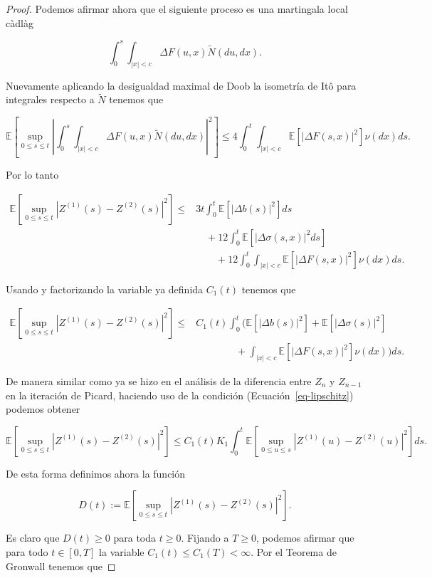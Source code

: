 \documentclass[
  spanish,
  us-letterpaper,
]{scrreprt}
\theoremstyle{plain}
\theoremstyle{plain}
\theoremstyle{definition}
\theoremstyle{plain}
\theoremstyle{remark}
\begin{document}
\begin{proof}
Podemos afirmar ahora que el siguiente proceso es una martingala local
càdlàg

\[
    \int_0^s\int_{|x|<c} \Delta F(u,x)\widetilde{N}(du,dx).
\]

Nuevamente aplicando la desigualdad maximal de Doob la isometría de Itô
para integrales respecto a \(\widetilde{N}\) tenemos que

\[
    \mathbb{E}\left[\sup\limits_{0\leq s\leq t}\left|\int_0^s\int_{|x|<c} \Delta F(u,x)\widetilde{N}(du,dx)\right|^2\right]\leq 4\int_0^t\int_{|x|<c}\mathbb{E}[|\Delta F(s,x)|^2]\nu(dx)ds.
\]

Por lo tanto

\[
    \begin{aligned}
        \mathbb{E}\left[\sup\limits_{0\leq s\leq t}\left|Z^{(1)}(s) - Z^{(2)}(s)\right|^2\right]\leq & 3t\int_0^t \mathbb{E}[|\Delta b(s)|^2]ds\\ 
        & \quad + 12 \int_0^t \mathbb{E}[|\Delta \sigma(s,x)|^2ds]\\ 
        & \qquad +12 \int_0^t\int_{|x|<c}\mathbb{E}[|\Delta F(s,x)|^2]\nu(dx)ds.
    \end{aligned}
\]

Usando y factorizando la variable ya definida \(C_1(t)\) tenemos que

\[
    \begin{aligned}
        \mathbb{E}\left[\sup\limits_{0\leq s\leq t}\left|Z^{(1)}(s) - Z^{(2)}(s)\right|^2\right]\leq & C_1(t)\int_0^t\Bigg(\mathbb{E}[|\Delta b(s)|^2]+\mathbb{E}[|\Delta \sigma(s)|^2]\\
        & \qquad\qquad +\int_{|x|<c}\mathbb{E}[|\Delta F(s,x)|^2]\nu(dx)\Bigg)ds.
    \end{aligned}
\]

De manera similar como ya se hizo en el análisis de la diferencia entre
\(Z_n\) y \(Z_{n-1}\) en la iteración de Picard, haciendo uso de la
condición (Ecuación~\ref{eq-lipschitz}) podemos obtener

\[
    \mathbb{E}\left[\sup\limits_{0\leq s\leq t}\left|Z^{(1)}(s) - Z^{(2)}(s)\right|^2\right]\leq C_1(t)K_1\int_0^t\mathbb{E}\left[\sup\limits_{0\leq u\leq s}|Z^{(1)}(u) - Z^{(2)}(u)|^2\right]ds.
\]

De esta forma definimos ahora la función

\[
    D(t):=\mathbb{E}\left[\sup\limits_{0\leq s\leq t}\left|Z^{(1)}(s) - Z^{(2)}(s)\right|^2\right].
\]

Es claro que \(D(t)\geq 0\) para toda \(t\geq 0\). Fijando a
\(T\geq 0\), podemos afirmar que para todo \(t\in [0,T]\) la variable
\(C_1(t)\leq C_1(T)<\infty\). Por el Teorema de Gronwall tenemos que


\end{proof}
\end{document}
